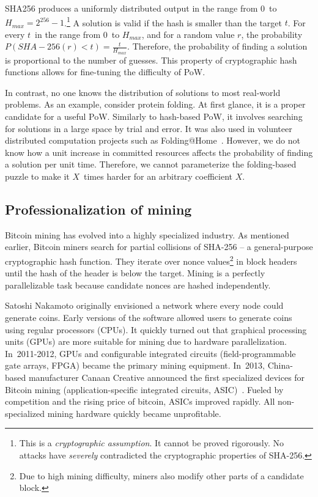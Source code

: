 SHA256 produces a uniformly distributed output in the range from $0$~to $H_{max} = 2^{256}-1$.\footnote{This is a \textit{cryptographic assumption}. It cannot be proved rigorously. No attacks have \textit{severely} contradicted the cryptographic properties of SHA-256.}
A solution is valid if the hash is smaller than the target $t$.
For every $t$~in the range from $0$~to $H_{max}$, and for a random value $r$, the probability $P({SHA-256}(r) < t) = \frac{t}{H_{max}}$.
Therefore, the probability of finding a solution is proportional to the number of guesses.
This property of cryptographic hash functions allows for fine-tuning the difficulty of PoW.

In contrast, no one knows the distribution of solutions to most real-world problems.
As an example, consider protein folding.
At first glance, it is a proper candidate for a useful PoW.
Similarly to hash-based PoW, it involves searching for solutions in a large space by trial and error.
It was also used in volunteer distributed computation projects such as Folding@Home~\cite{Beberg2009}.
However, we do not know how a unit increase in committed resources affects the probability of finding a solution per unit time.
Therefore, we cannot parameterize the folding-based puzzle to make it $X$~times harder for an arbitrary coefficient $X$.


\subsection{Professionalization of mining}

Bitcoin mining has evolved into a highly specialized industry.
As mentioned earlier, Bitcoin miners search for partial collisions of SHA-256 -- a general-purpose cryptographic hash function.
They iterate over nonce values\footnote{Due to high mining difficulty, miners also modify other parts of a candidate block.} in block headers until the hash of the header is below the target.
Mining is a perfectly parallelizable task because candidate nonces are hashed independently.

Satoshi Nakamoto originally envisioned a network where every node could generate coins.
Early versions of the software allowed users to generate coins using regular processors (CPUs).
It quickly turned out that graphical processing units (GPUs) are more suitable for mining due to hardware parallelization.
In~2011-2012, GPUs and configurable integrated circuits (field-programmable gate arrays, FPGA) became the primary mining equipment.
In~2013, China-based manufacturer Canaan Creative announced the first specialized devices for Bitcoin mining (application-specific integrated circuits, ASIC)~\cite{Kim2020}.
Fueled by competition and the rising price of bitcoin, ASICs improved rapidly.
All non-specialized mining hardware quickly became unprofitable.

